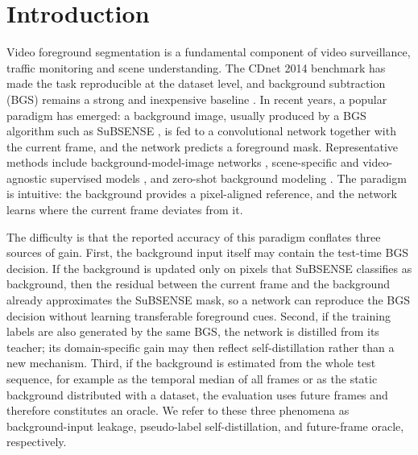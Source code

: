 \documentclass[sn-mathphys-num,iicol]{sn-jnl}
\begin{document}

\maketitle

\section{Introduction}\label{sec:intro}

Video foreground segmentation is a fundamental component of video surveillance,
traffic monitoring and scene understanding. The CDnet 2014 benchmark
\cite{cdnet2014} has made the task reproducible at the dataset level, and
background subtraction (BGS) remains a strong and inexpensive baseline
\cite{stauffer1999,vibe2011,subsense2015,pbas2012}.
In recent years, a popular paradigm has emerged: a background image, usually
produced by a BGS algorithm such as SuBSENSE \cite{subsense2015}, is fed to a
convolutional network together with the current frame, and the network predicts
a foreground mask. Representative methods include background-model-image
networks \cite{kimbgsub2020}, scene-specific and video-agnostic supervised models
\cite{braham2016,babaee2018,fgsegnet2018,fgsegnetv2_2020,bsuvnet2020,bsuvnet2021,bgsubnet2024},
and zero-shot background modeling \cite{zbs2023}. The paradigm is intuitive:
the background provides a pixel-aligned reference, and the network learns where
the current frame deviates from it.

The difficulty is that the reported accuracy of this paradigm conflates three
sources of gain. First, the background input itself may contain the test-time
BGS decision. If the background is updated only on pixels that SuBSENSE classifies
as background, then the residual between the current frame and the background
already approximates the SuBSENSE mask, so a network can reproduce the BGS
decision without learning transferable foreground cues. Second, if the training
labels are also generated by the same BGS, the network is distilled from its
teacher; its domain-specific gain may then reflect self-distillation rather than
a new mechanism. Third, if the background is estimated from the whole test
sequence, for example as the temporal median of all frames or as the static
background distributed with a dataset, the evaluation uses future frames and
therefore constitutes an oracle. We refer to these three phenomena as
background-input leakage, pseudo-label self-distillation, and future-frame
oracle, respectively.
\end{document}
